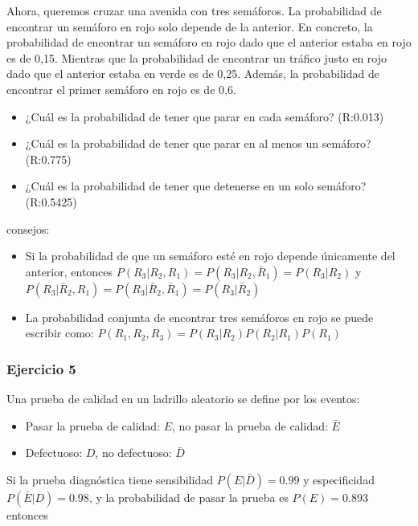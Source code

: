 \documentclass[
]{book}
\providecommand{\tightlist}{%
  \setlength{\itemsep}{0pt}\setlength{\parskip}{0pt}}
\begin{document}
Ahora, queremos cruzar una avenida con tres semáforos. La probabilidad de encontrar un semáforo en rojo solo depende de la anterior. En concreto, la probabilidad de encontrar un semáforo en rojo dado que el anterior estaba en rojo es de 0,15. Mientras que la probabilidad de encontrar un tráfico justo en rojo dado que el anterior estaba en verde es de 0,25. Además, la probabilidad de encontrar el primer semáforo en rojo es de 0,6.

\begin{itemize}
\tightlist
\item
  ¿Cuál es la probabilidad de tener que parar en cada semáforo? (R:0.013)
\item
  ¿Cuál es la probabilidad de tener que parar en al menos un semáforo? (R:0.775)
\item
  ¿Cuál es la probabilidad de tener que detenerse en un solo semáforo? (R:0.5425)
\end{itemize}

consejos:

\begin{itemize}
\item
  Si la probabilidad de que un semáforo esté en rojo depende únicamente del anterior, entonces
  \(P(R_3|R_2,R_1)=P(R_3|R_2,\bar{R}_1)=P(R_3|R_2)\) y \(P(R_3|\bar{R}_2,R_1)=P(R_3 |\bar{R}_2,\bar{R}_1)=P(R_3|\bar{R}_2)\)
\item
  La probabilidad conjunta de encontrar tres semáforos en rojo se puede escribir como:
  \(P(R_1,R_2,R_3)=P(R_3|R_2)P(R_2|R_1)P(R_1)\)
\end{itemize}

\hypertarget{ejercicio-5}{%
\subsubsection{Ejercicio 5}\label{ejercicio-5}}

Una prueba de calidad en un ladrillo aleatorio se define por los eventos:

\begin{itemize}
\tightlist
\item
  Pasar la prueba de calidad: \(E\), no pasar la prueba de calidad: \(\bar{E}\)
\item
  Defectuoso: \(D\), no defectuoso: \(\bar{D}\)
\end{itemize}

Si la prueba diagnóstica tiene sensibilidad \(P(E|\bar{D})=0.99\) y especificidad \(P(\bar{E}|D)=0.98\), y la probabilidad de pasar la prueba es \(P(E) =0.893\) entonces
\end{document}
